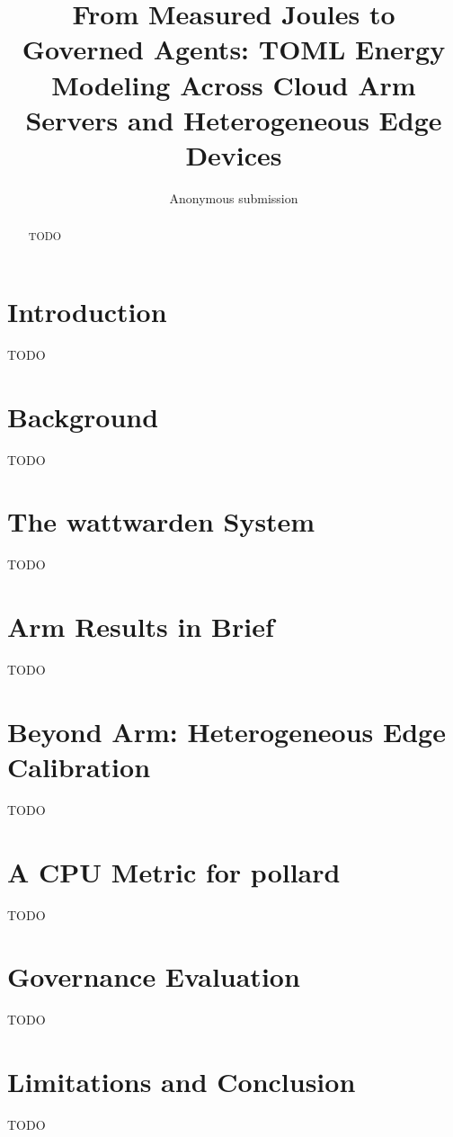 \documentclass[letterpaper,10pt,twocolumn]{article}
\title{From Measured Joules to Governed Agents: TOML Energy Modeling
Across Cloud Arm Servers and Heterogeneous Edge Devices}
\author{Anonymous submission}
\date{}
\begin{document}
\maketitle

\begin{abstract}
TODO
\end{abstract}

\section{Introduction}
TODO

\section{Background}
TODO

\section{The wattwarden System}
TODO

\section{Arm Results in Brief}
TODO

\section{Beyond Arm: Heterogeneous Edge Calibration}
TODO

\section{A CPU Metric for pollard}
TODO

\section{Governance Evaluation}
TODO

\section{Limitations and Conclusion}
TODO


\end{document}
